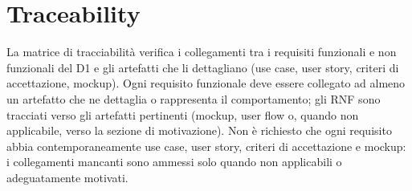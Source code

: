 \section{Traceability}
\label{sec:traceability}

La matrice di tracciabilità verifica i collegamenti tra i requisiti funzionali e non funzionali del D1 e gli artefatti che li dettagliano (use case, user story, criteri di accettazione, mockup). Ogni requisito funzionale deve essere collegato ad almeno un artefatto che ne dettaglia o rappresenta il comportamento; gli RNF sono tracciati verso gli artefatti pertinenti (mockup, user flow o, quando non applicabile, verso la sezione di motivazione). Non è richiesto che ogni requisito abbia contemporaneamente use case, user story, criteri di accettazione e mockup: i collegamenti mancanti sono ammessi solo quando non applicabili o adeguatamente motivati.

